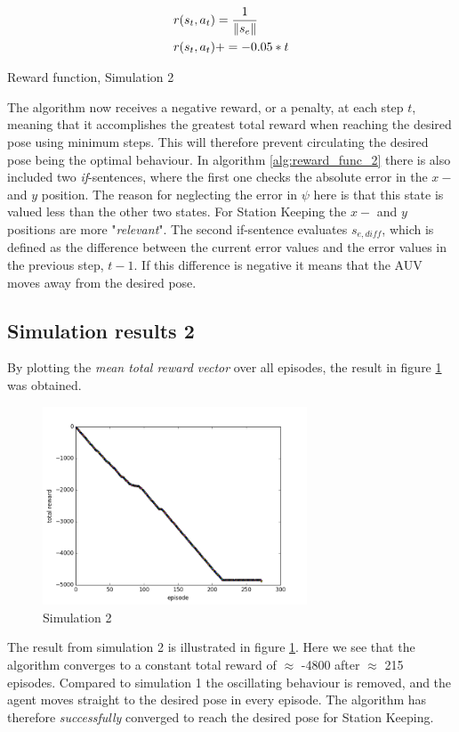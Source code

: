 \begin{algorithm}[H]
\SetAlgoLined
\begin{align}
    r(s_{t}, a_{t}) & = \frac{1}{\left\lVert s_{e}\right\rVert} \\
    r(s_{t}, a_{t}) & += -0.05*t
\end{align}
\caption{Reward function, Simulation 2}
\label{alg:reward_func_2}
\end{algorithm}
The algorithm now receives a negative reward, or a penalty, at each step $t$, meaning that it accomplishes the greatest total reward when reaching the desired pose using minimum steps. This will therefore prevent circulating the desired pose being the optimal behaviour. In algorithm \ref{alg:reward_func_2} there is also included two \textit{if}-sentences, where the first one checks the absolute error in the $x-$ and $y$ position. The reason for neglecting the error in $\psi$ here is that this state is valued less than the other two states. For Station Keeping the $x-$ and $y$ positions are more "\textit{relevant}". The second if-sentence evaluates $s_{e,diff}$, which is defined as the difference between the current error values and the error values in the previous step, $t-1$. If this difference is negative it means that the AUV moves away from the desired pose.
\subsection*{Simulation results 2}
By plotting the \textit{mean total reward vector} over all episodes, the result in figure \ref{fig:sim2} was obtained.
\begin{figure}[H]
    \centering
    \includegraphics[width=0.7\textwidth]{images/chap5/figure_1-1.png}
    \caption{Simulation 2}
    \label{fig:sim2}
\end{figure}
The result from simulation 2 is illustrated in figure \ref{fig:sim2}. Here we see that the algorithm converges to a constant total reward of $\approx$ -4800 after $\approx$ 215 episodes. Compared to simulation 1 the oscillating behaviour is removed, and the agent moves straight to the desired pose in every episode. The algorithm has therefore \textit{successfully} converged to reach the desired pose for Station Keeping.

